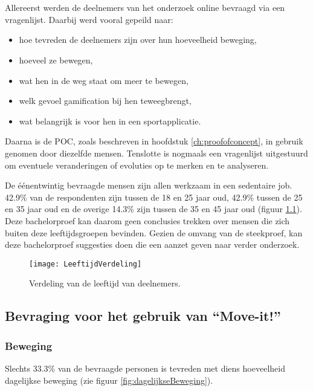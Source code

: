 \chapter{}%
\label{ch:analyse}

Allereerst werden de deelnemers van het onderzoek online bevraagd via een vragenlijst. Daarbij werd vooral gepeild naar:
\begin{itemize}
    \item hoe tevreden de deelnemers zijn over hun hoeveelheid beweging,
    \item hoeveel ze bewegen,
    \item wat hen in de weg staat om meer te bewegen,
    \item welk gevoel gamification bij hen teweegbrengt,
    \item wat belangrijk is voor hen in een sportapplicatie.
\end{itemize}

Daarna is de POC, zoals beschreven in hoofdstuk \ref{ch:proofofconcept}, in gebruik genomen door diezelfde mensen. Tenslotte is nogmaals een vragenlijst uitgestuurd om eventuele veranderingen of evoluties op te merken en te analyseren.

De éénentwintig bevraagde mensen zijn allen werkzaam in een sedentaire job. 42.9\% van de respondenten zijn tussen de 18 en 25 jaar oud, 42.9\% tussen de 25 en 35 jaar oud en de overige 14.3\% zijn tussen de 35 en 45 jaar oud (figuur \ref{fig:leeftijd}). Deze bachelorproef kan daarom geen conclusies trekken over mensen die zich buiten deze leeftijdsgroepen bevinden. Gezien de omvang van de steekproef, kan deze bachelorproef suggesties doen die een aanzet geven naar verder onderzoek.

\begin{figure}
    \caption[Verdeling van de leeftijd van deelnemers]{Verdeling van de leeftijd van deelnemers.}
    \texttt{[image: LeeftijdVerdeling]}
    \label{fig:leeftijd}
\end{figure}

\section{Bevraging voor het gebruik van ``Move-it!''}

\subsection{Beweging}
Slechts 33.3\% van de bevraagde personen is tevreden met diens hoeveelheid dagelijkse beweging (zie figuur \ref{fig:dagelijkseBeweging}).

